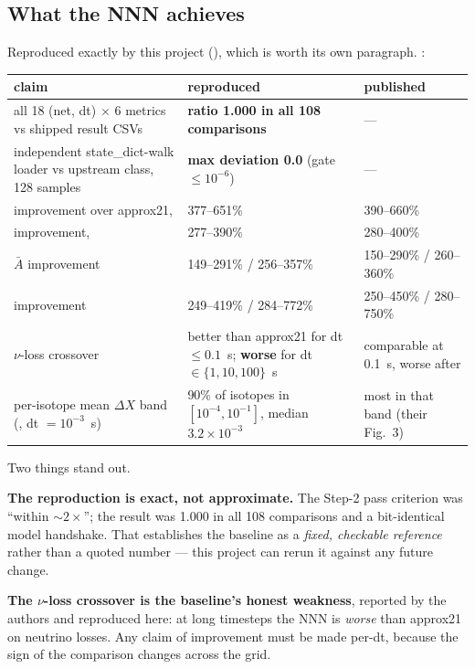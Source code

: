 \subsection{What the NNN achieves}
\label{sec:nnnachieves}

Reproduced exactly by this project (), which is worth its own
paragraph. :

\begingroup\small
\begin{tabularx}{\textwidth}{@{}L{5.0cm} Y L{3.6cm}@{}}
\toprule
\textbf{claim} & \textbf{reproduced} & \textbf{published} \\
\midrule
all 18 (net, dt) $\times$ 6 metrics vs shipped result CSVs & \textbf{ratio
  1.000 in all 108 comparisons} & --- \\
independent state\_dict-walk loader vs upstream class, 128 samples &
  \textbf{max deviation 0.0} (gate $\le 10^{-6}$) & --- \\
\Ye{} improvement over approx21,  & 377--651\% & 390--660\% \\
\Ye{} improvement,  & 277--390\% & 280--400\% \\
$\bar A$ improvement & 149--291\% / 256--357\% & 150--290\% / 260--360\% \\
\enuc{} improvement & 249--419\% / 284--772\% & 250--450\% / 280--750\% \\
$\nu$-loss crossover & better than approx21 for dt $\le 0.1$~s;
  \textbf{worse} for dt $\in \{1, 10, 100\}$~s & comparable at 0.1~s, worse
  after \\
per-isotope mean $\Delta X$ band (, dt $= 10^{-3}$~s) & 90\% of
  isotopes in $[10^{-4}, 10^{-1}]$, median $3.2 \times 10^{-3}$ & most in that
  band (their Fig.~3) \\
\bottomrule
\end{tabularx}
\endgroup

Two things stand out.

\textbf{The reproduction is exact, not approximate.} The Step-2 pass criterion
was ``within ${\sim}2\times$''; the result was 1.000 in all 108 comparisons and
a bit-identical model handshake. That establishes the baseline as a
\emph{fixed, checkable reference} rather than a quoted number --- this project
can rerun it against any future change.

\textbf{The $\nu$-loss crossover is the baseline's honest weakness}, reported
by the authors and reproduced here: at long timesteps the NNN is \emph{worse}
than approx21 on neutrino losses. Any claim of improvement must be made per-dt,
because the sign of the comparison changes across the grid.

